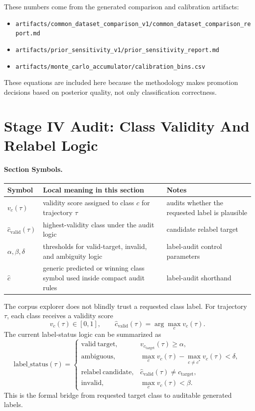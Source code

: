 \documentclass[11pt]{article}
\newcommand{\codepath}[1]{\nolinkurl{#1}}
\newcommand{\sectionsymbol}[3]{#1 & #2 & #3 \\}
\newcommand{\sectionsymbols}[1]{%
\begin{center}
\small
\setlength{\tabcolsep}{4pt}
\begin{tabularx}{0.95\textwidth}{>{\raggedright\arraybackslash}p{0.16\textwidth}X>{\raggedright\arraybackslash}p{0.18\textwidth}}
\toprule
Symbol & Local meaning in this section & Notes \\
\midrule
#1
\bottomrule
\end{tabularx}
\end{center}
}
\begin{document}
These numbers come from the generated comparison and calibration artifacts:
\begin{itemize}[leftmargin=1.5em]
  \item \codepath{artifacts/common_dataset_comparison_v1/common_dataset_comparison_report.md}
  \item \codepath{artifacts/prior_sensitivity_v1/prior_sensitivity_report.md}
  \item \codepath{artifacts/monte_carlo_accumulator/calibration_bins.csv}
\end{itemize}

These equations are included here because the methodology makes promotion decisions based on posterior quality, not only classification correctness.

\section{Stage IV Audit: Class Validity And Relabel Logic}
\paragraph{Section Symbols.}
\sectionsymbols{
\sectionsymbol{\(v_c(\tau)\)}{validity score assigned to class \(c\) for trajectory \(\tau\)}{audits whether the requested label is plausible}
\sectionsymbol{\(\hat{c}_{\mathrm{valid}}(\tau)\)}{highest-validity class under the audit logic}{candidate relabel target}
\sectionsymbol{\(\alpha,\beta,\delta\)}{thresholds for valid-target, invalid, and ambiguity logic}{label-audit control parameters}
\sectionsymbol{\(\hat{c}\)}{generic predicted or winning class symbol used inside compact audit rules}{label-audit shorthand}
}

\noindent
The corpus explorer does not blindly trust a requested class label. For trajectory \(\tau\), each class receives a validity score
\begin{equation}
v_c(\tau) \in [0,1],
\qquad
\hat{c}_{\mathrm{valid}}(\tau) = \arg\max_c v_c(\tau).
\end{equation}
The current label-status logic can be summarized as
\begin{equation}
\mathrm{label\_status}(\tau)=
\begin{cases}
\mathrm{valid\ target}, & v_{c_{\mathrm{target}}}(\tau)\ge \alpha, \\
\mathrm{ambiguous}, & \max_c v_c(\tau)-\max_{c \neq c^*} v_c(\tau) < \delta, \\
\mathrm{relabel\ candidate}, & \hat{c}_{\mathrm{valid}}(\tau)\neq c_{\mathrm{target}}, \\
\mathrm{invalid}, & \max_c v_c(\tau) < \beta.
\end{cases}
\end{equation}
This is the formal bridge from requested target class to auditable generated labels.
\end{document}
